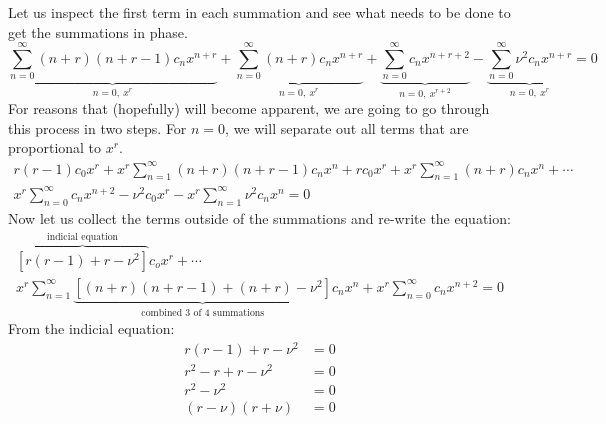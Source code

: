 Let us inspect the first term in each summation and see what needs to be done to get the summations in phase.
\begin{equation*}
\underbrace{\sum\limits_{n=0}^{\infty}(n+r)(n+r-1)c_nx^{n+r}}_{n=0, \ x^r} + \underbrace{\sum\limits_{n=0}^{\infty}(n+r)c_nx^{n+r}}_{n=0, \ x^r} + \underbrace{\sum\limits_{n=0}^{\infty}c_nx^{n+r+2}}_{n=0, \ x^{r+2}} - \underbrace{\sum\limits_{n=0}^{\infty}\nu^2c_n x^{n+r}}_{n=0, \ x^r} = 0
\end{equation*}
For reasons that (hopefully) will become apparent, we are going to go through this process in two steps.  For $n=0$, we will separate out all terms that are proportional to $x^r$.
\begin{multline*}
r(r-1)c_0x^r + x^r\sum\limits_{n=1}^{\infty}(n+r)(n+r-1)c_nx^n + rc_0x^r + x^r\sum\limits_{n=1}^{\infty}(n+r)c_nx^n + \cdots \\
x^r\sum\limits_{n=0}^{\infty}c_nx^{n+2} - \nu^2c_0x^r - x^r\sum\limits_{n=1}^{\infty}\nu^2c_nx^{n} = 0
\end{multline*}
Now let us collect the terms outside of the summations and re-write the equation:
\begin{multline*}
\overbrace{\left[r(r-1)+r - \nu^2 \right]}^{\text{indicial equation}}c_ox^r + \cdots \\ x^r\sum\limits_{n=1}^{\infty}\underbrace{\left[(n+r)(n+r-1) + (n+r) - \nu^2\right]}_{\text{combined 3 of 4 summations}}c_nx^n +  x^r\sum\limits_{n=0}^{\infty}c_nx^{n+2} = 0
\end{multline*}
From the indicial equation:
\begin{align*}
r(r-1)+r-\nu^2 &= 0\\
r^2 - r + r - \nu^2 &= 0 \\
r^2 - \nu^2 &= 0 \\
(r - \nu)(r+\nu) &= 0
\end{align*}
